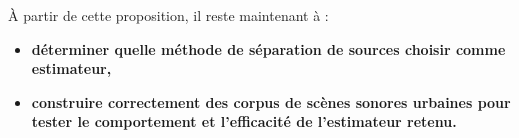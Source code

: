 À partir de cette proposition, il reste maintenant à :
\begin{itemize}
\item \textbf{déterminer quelle méthode de séparation de sources choisir comme estimateur, }
\item \textbf{construire correctement des corpus de scènes sonores urbaines pour tester le comportement et l'efficacité de l'estimateur retenu.}
\end{itemize}



